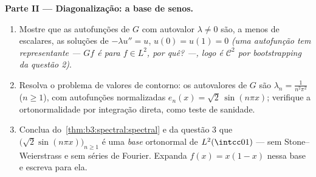 \begin{problem}
\medskip
\noindent\textbf{Parte II --- Diagonalização: a base de senos.}
\begin{enumerate}[resume]
  \item Mostre que as autofunções de $G$ com autovalor $\lambda \ne 0$ são, a
        menos de escalares, as soluções de $-\lambda u'' = u$, $u(0) = u(1) = 0$ \emph{(uma
        autofunção tem representante  --- $Gf$ é 
        para $f \in L^2$, por quê? ---, logo é $\mathcal C^2$ por bootstrapping da
        questão 2)}.
  \item Resolva o problema de valores de contorno: os autovalores de
        $G$ são $\lambda_n = \frac1{n^2\pi^2}$ ($n \geq 1$), com autofunções normalizadas $e_n(x) =
        \sqrt2\,\sin(n\pi x)$;
        verifique a ortonormalidade por integração direta, como teste de
        sanidade.
  \item Conclua do~\cref{thm:b3:spectral:spectral} e da questão 3 que $\bigl(\sqrt2\sin(n\pi x)\bigr)_{n\geq1}$ é uma
        \emph{base} ortonormal de $L^2(\intcc01)$ --- sem Stone--Weierstrass e sem
        séries de Fourier. Expanda $f(x) = x(1-x)$ nessa base e escreva 
        para ela.
\end{enumerate}


\end{problem}

